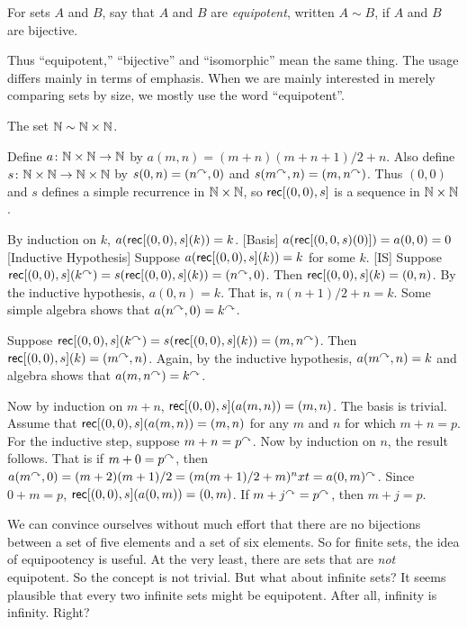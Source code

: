 \begin{defn}
	For sets $A$ and $B$, say that $A$ and $B$ are \emph{equipotent}, written $A\sim B$, if $A$ and $B$ are bijective.
\end{defn}

Thus ``equipotent,'' ``bijective'' and ``isomorphic'' mean the same thing.
The usage differs mainly in terms of emphasis.
When we are mainly interested in merely comparing sets by size, we mostly use the word ``equipotent''. 

\begin{example}
	The set $\mathbb N\sim \mathbb N\times \mathbb N$.
	
	Define ${a}\colon{\mathbb N\times \mathbb N}\to{\mathbb N}$ by $a(m,n) = (m+n)(m+n+1)/2 + n$. 
	Also define ${s}\colon{\mathbb N\times \mathbb N}\to{\mathbb N\times \mathbb N}$ by
	$s(0,n) = (n^\curvearrowright,0)$ and $s(m^\curvearrowright,n) = (m,n^\curvearrowright)$.
	Thus $(0,0)$ and $s$ defines a simple recurrence in $\mathbb N\times \mathbb N$,
	so $\mathord{\textsf{rec}}[(0,0),s]$ is a sequence in $\mathbb N\times \mathbb N$. 
	
	By induction on $k$, $a(\mathord{\textsf{rec}}[(0,0),s](k)) = k$. 
	[Basis]  $a(\mathord{\textsf{rec}}[(0,0,s)(0)])=a(0,0) = 0$
	[Inductive Hypothesis] Suppose $a(\mathord{\textsf{rec}}[(0,0),s](k)) = k$ for some $k$. 
	[IS] Suppose $\mathord{\textsf{rec}}[(0,0),s](k^\curvearrowright) = s(\mathord{\textsf{rec}}[(0,0),s](k)) = (n^\curvearrowright,0)$. Then $\mathord{\textsf{rec}}[(0,0),s](k) = (0,n)$. By the inductive hypothesis, $a(0,n)=k$. That is,
	$n(n+1)/2+n = k$. Some simple algebra shows that $a(n^\curvearrowright,0)= k^\curvearrowright$.
	
	Suppose $\mathord{\textsf{rec}}[(0,0),s](k^\curvearrowright) = s(\mathord{\textsf{rec}}[(0,0),s](k)) = (m,n^\curvearrowright)$.
	Then $\mathord{\textsf{rec}}[(0,0),s](k) = (m^\curvearrowright,n)$.
	Again, by the inductive hypothesis, $a(m^\curvearrowright,n)=k$ and algebra shows 
	that $a(m,n^\curvearrowright) = k^\curvearrowright$.
	
	Now by induction on $m+n$, $\mathord{\textsf{rec}}[(0,0),s](a(m,n)) = (m,n)$.
	The basis is trivial. 
	Assume that $\mathord{\textsf{rec}}[(0,0),s](a(m,n)) = (m,n)$ for any $m$ and $n$ for which $m+n=p$. 
	For the inductive step, suppose $m+n=p^\curvearrowright$. 
	Now by induction on $n$, the result follows. 
	That is if $m+0 = p^\curvearrowright$,
	then $a(m^\curvearrowright,0)= (m+2)(m+1)/2 = (m(m+1)/2 + m)^nxt = a(0,m)^\curvearrowright$. Since $0+m=p$,
	$\mathord{\textsf{rec}}[(0,0),s](a(0,m)) = (0,m)$. If $m+j^\curvearrowright = p^\curvearrowright$, then $m+j = p$. 
	
\end{example}

We can convince ourselves without much effort that there are no bijections between a set of five elements and a set of six elements. So for finite sets, the idea of equipootency is useful. At the very least, there are sets that are \emph{not} equipotent. So the concept is not trivial. But what about infinite sets? It seems plausible that every two infinite sets might be equipotent. After all, infinity is infinity. Right? 

